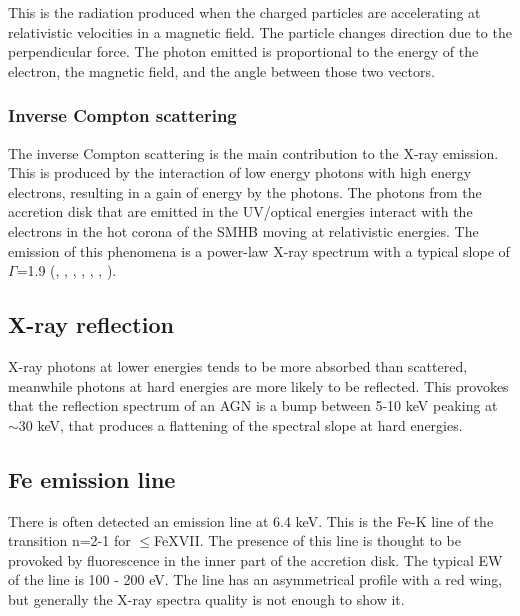 This is the radiation produced when the charged particles are accelerating at relativistic velocities in a magnetic field. The particle changes direction due to the perpendicular force. The photon emitted is proportional to the energy of the electron, the magnetic field, and the angle between those two vectors.

\subsubsection{Inverse Compton scattering}
\label{sec1:csem}

The inverse Compton scattering is the main contribution to the X-ray emission. This is produced by the interaction of low energy photons with high energy electrons, resulting in a gain of energy by the photons. The photons from the accretion disk that are emitted in the UV/optical energies interact with the electrons in the hot corona of the SMHB moving at relativistic energies. The emission of this phenomena is a power-law X-ray spectrum with a typical slope of $\Gamma$=1.9 (\citealt{caccianiga04}, \citealt{gaalbiati05}, \citealt{mateos05a}, \citealt{mateos05b}, \citealt{tozzi06}, \citealt{mateos10}, \citealt{corral11}).

\subsection{X-ray reflection}
\label{sec1:xrem}

X-ray photons at lower energies tends to be more absorbed than scattered, meanwhile photons at hard energies are more likely to be reflected. This provokes that the reflection spectrum of an AGN is a bump between 5-10 keV peaking at $\sim$30 keV, that produces a flattening of the spectral slope at hard energies.

\subsection{Fe emission line}
\label{sec1:feem}

There is often detected an emission line at 6.4 keV. This is the  Fe-K line of the transition n=2-1 for $\leq$FeXVII. The presence of this line is thought to be provoked by fluorescence in the inner part of the accretion disk. The typical EW of the line is 100 - 200 eV. The line has an asymmetrical profile with a red wing, but generally the X-ray spectra quality is not enough to show it.





